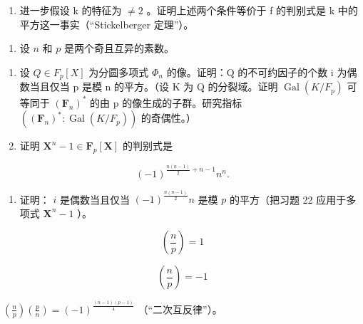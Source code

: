 \begin{enumerate}
\def\labelenumi{\alph{enumi})}
\setcounter{enumi}{1}
\tightlist
\item
  进一步假设 k 的特征为 \(\neq 2\) 。证明上述两个条件等价于 f 的判别式是 k 中的平方这一事实（“Stickelberger 定理”）。
\end{enumerate}

\begin{enumerate}
\def\labelenumi{\arabic{enumi})}
\setcounter{enumi}{22}
\tightlist
\item
  设 \(n\) 和 \(p\) 是两个奇且互异的素数。
\end{enumerate}

\begin{enumerate}
\def\labelenumi{\alph{enumi})}
\item
  设 \(Q \in F_{p}[X]\) 为分圆多项式 \(\Phi_{n}\) 的像。证明：Q 的不可约因子的个数 i 为偶数当且仅当 p 是模 n 的平方。（设 K 为 Q 的分裂域。证明 \(\operatorname{Gal}(K/F_{p})\) 可等同于 \((\mathbf{F}_{n})^{*}\) 的由 p 的像生成的子群。研究指标 \(((\mathbf{F}_{n})^{*}: \operatorname{Gal}(K/F_{p}))\) 的奇偶性。）
\item
  证明 \(\mathbf{X}^n - 1 \in \mathbf{F}_p[\mathbf{X}]\) 的判别式是
\end{enumerate}

\[
(- 1) ^ {\frac {n (n - 1)}{2} + n - 1} n ^ {n}.
\]

\begin{enumerate}
\def\labelenumi{\alph{enumi})}
\setcounter{enumi}{2}
\tightlist
\item
  证明： \(i\) 是偶数当且仅当 \((-1)^{\frac{n(n - 1)}{2}} n\) 是模 \(p\) 的平方（把习题 22 应用于多项式 \(\mathbf{X}^n - 1\) ）。
\end{enumerate}

\[
\left(\frac {n}{p}\right) = 1
\]

\[
\left(\frac {n}{p}\right) = - 1
\]

\(\left(\frac{n}{p}\right)\left(\frac{p}{n}\right) = (-1)^{\frac{(n - 1)(p - 1)}{4}}\) （“二次互反律”）。
